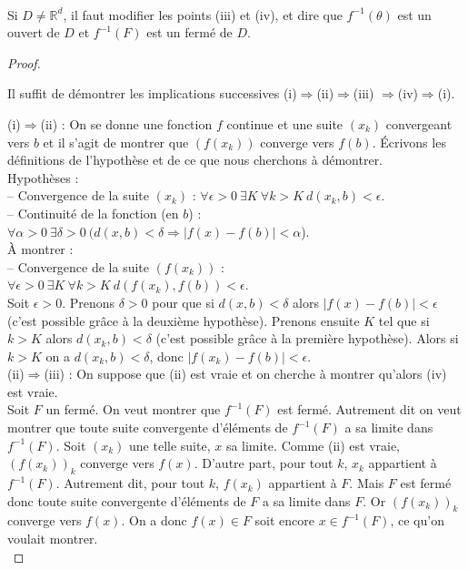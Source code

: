 \documentclass[class=report,crop=false]{standalone}
\begin{document}
\\
Si $D  \neq \mathbb{R}^d$, il faut modifier les points (iii) et (iv), et dire que $f^{-1}(\theta)$ est un ouvert de $D$ et $f^{-1}(F)$ est un fermé de $D$.

\begin{proof} \rm \  

Il suffit de démontrer les implications successives (i)$\Rightarrow$(ii)$\Rightarrow$(iii) $\Rightarrow$(iv)$\Rightarrow$(i).

(i)$\Rightarrow$(ii) : On se donne une fonction $f$ continue et une suite $(x_k)$ convergeant vers $b$ et il s'agit de montrer que $(f(x_k))$ converge vers $f(b)$. \'Ecrivons les définitions de l'hypoth\`ese et de ce que nous cherchons \`a démontrer.\\
Hypoth\`eses : \\
-- Convergence de la suite $(x_k)$ : $\forall \epsilon>0\ \exists K\ \forall k>K\ d(x_k,b)<\epsilon$.\\
-- Continuité de la fonction (en $b$) : $\forall \alpha>0\ \exists \delta>0\ (d(x,b)<\delta\Rightarrow |f(x)-f(b)|<\alpha$).\\
\`A montrer : \\
-- Convergence de la suite $(f(x_k))$ : $\forall \epsilon>0\ \exists K\ \forall k>K\ d(f(x_k),f(b))<\epsilon$.\\
Soit $\epsilon>0$. Prenons $\delta>0$ pour que si $d(x,b)<\delta$ alors $|f(x)-f(b)|<\epsilon$ (c'est possible grâce \`a la deuxi\`eme hypoth\`ese). Prenons ensuite $K$ tel que si $k>K$ alors $d(x_k,b)<\delta$ (c'est possible grâce \`a la premi\`ere hypoth\`ese). Alors si $k>K$ on a $d(x_k,b)<\delta$, donc  $|f(x_k)-f(b)|<\epsilon$.\\

(ii)$\Rightarrow$(iii) : On suppose que (ii) est vraie et on cherche \`a montrer qu'alors (iv) est vraie. \\
Soit $F$ un fermé. On veut montrer que $f^{-1}(F)$ est fermé. Autrement dit on veut montrer que toute suite convergente d'éléments de $f^{-1}(F)$ a sa limite dans $f^{-1}(F)$. Soit $(x_k)$ une telle suite, $x$ sa limite. Comme (ii) est vraie, $(f(x_k))_k$ converge vers $f(x)$. D'autre part, pour tout $k$, $x_k$ appartient \`a $f^{-1}(F)$. Autrement dit, pour tout $k$, $f(x_k)$ appartient \`a $F$. Mais $F$ est fermé donc toute suite convergente d'éléments de $F$ a sa limite dans $F$.  Or $(f(x_k))_k$ converge vers $f(x)$. On a donc $f(x)\in F$ soit encore $x\in   f^{-1}(F)$, ce qu'on voulait montrer.\\


\end{proof}
\end{document}
